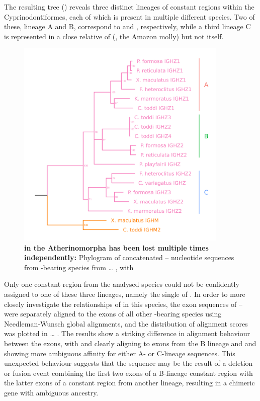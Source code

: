 The resulting tree () reveals three distinct lineages of  constant regions within the Cyprinodontiformes, each of which is present in multiple different species. Two of these, lineage A and B, correspond to \Xma {} and , respectively, while a third lineage C is represented in a close relative of \Xma (, the Amazon molly) but not \Xma itself. 

\begin{figure}
	\centering
	\includegraphics[width=0.9\textwidth]{_Figures/png/multispecies-cz-tree}
	\caption[ in the Atherinomorpha has been lost multiple times independently]{\textbf{ in the Atherinomorpha has been lost multiple times independently:} 
	Phylogram of concatenated -- nucleotide sequences from -bearing species from \dots %
	, with }
	\label{fig:multispecies-cz-tree}
\end{figure}

Only one  constant region from the analysed species could not be confidently assigned to one of these three lineages, namely the single  of . In order to more closely investigate the relationships of  in this species, the exon sequences of  -- were separately aligned to the \cz{} exons of all other -bearing species using Needleman-Wunsch global alignments, and the distribution of alignment scores was plotted in \dots %
. The results show a striking difference in alignment behaviour between the exons, with  and  clearly aligning to exons from the B lineage and  and  showing more ambiguous affinity for either A- or C-lineage sequences. This unexpected behaviour suggests that the   sequence may be the result of a deletion or fusion event combining the first two exons of a B-lineage  constant region with the latter exons of a constant region from another lineage, resulting in a chimeric gene with ambiguous ancestry.

